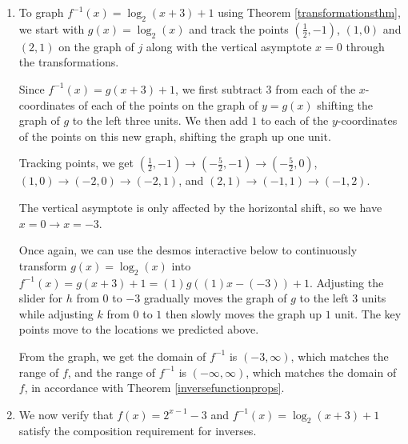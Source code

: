\documentclass{ximera}
\begin{document}
\begin{example}
\begin{explanation}
\begin{enumerate}
 

By definition, $\log_{2}(x)$ undoes exponentiation by $2$.  Hence, $f^{-1}$ should: first,  add $3$.  Second,  take the logarithm base $2$ of the result of the first step. Lastly,  add $1$ to the result of the second ste.  In symbols, $f^{-1}(x) = \log_{2}(x+3)+1$.  


\item  To graph $f^{-1}(x) = \log_{2}(x+3)+1$ using Theorem \ref{transformationsthm}, we start with $g(x) = \log_{2}(x)$ and track the points $\left(\frac{1}{2},-1\right)$, $(1,0)$ and $(2, 1)$ on the graph of $j$ along with the vertical asymptote $x=0$ through the transformations.


Since $f^{-1}(x) = g(x+3)+1$, we first subtract $3$ from each of the $x$-coordinates of each of the points on the graph of $y=g(x)$ shifting the graph of $g$ to the left three units.  We then add $1$ to each of the $y$-coordinates of the points on this new graph, shifting the graph up one unit. 

 

Tracking points, we get   $\left(\frac{1}{2},-1\right) \rightarrow \left(-\frac{5}{2},-1\right) \rightarrow \left(-\frac{5}{2},0\right)$, $(1,0) \rightarrow (-2,0) \rightarrow (-2,1)$, and $(2, 1) \rightarrow (-1, 1) \rightarrow (-1, 2)$.  

 

The vertical asymptote is only affected by the horizontal shift, so we have $x = 0 \rightarrow x = -3$.

 Once again, we can use the desmos interactive below to continuously transform $g(x) = \log_{2}(x)$ into  $f^{-1}(x) = g(x+3)+1 = (1) g((1) x - (-3)) + 1$.  Adjusting the slider for $h$ from $0$ to $-3$ gradually moves the graph of $g$ to the left $3$ units while adjusting $k$ from $0$ to $1$ then slowly moves the graph up $1$ unit.  The key points move to the locations we predicted above.


\begin{center}
\end{center}

From the graph, we  get the  domain of $f^{-1}$ is $(-3, \infty)$, which matches the range of $f$, and the range of $f^{-1}$ is $(-\infty, \infty)$, which matches the domain of $f$, in accordance with Theorem \ref{inversefunctionprops}.

\item  We now verify that $f(x) = 2^{x-1}-3$ and $f^{-1}(x) = \log_{2}(x+3)+1$ satisfy the composition requirement for inverses. 


\end{enumerate}
\end{explanation}
\end{example}
\end{document}
